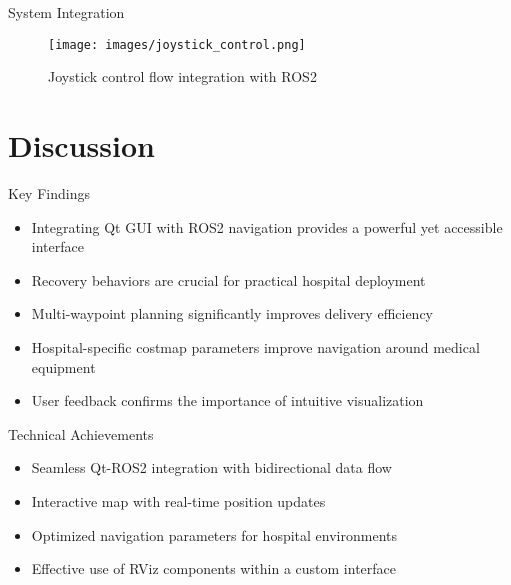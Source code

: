 \documentclass[aspectratio=169]{beamer}
\begin{document}
\begin{frame}{System Integration}
  \begin{figure}
    \centering
    \texttt{[image: images/joystick\_control.png]}
    \caption{Joystick control flow integration with ROS2}
  \end{figure}
\end{frame}

\section{Discussion}

\begin{frame}{Key Findings}
  \begin{itemize}
  \item Integrating Qt GUI with ROS2 navigation provides a powerful yet accessible interface
  \item Recovery behaviors are crucial for practical hospital deployment
  \item Multi-waypoint planning significantly improves delivery efficiency
  \item Hospital-specific costmap parameters improve navigation around medical equipment
  \item User feedback confirms the importance of intuitive visualization
  \end{itemize}
  
  \begin{block}{Technical Achievements}
    \begin{itemize}
    \item Seamless Qt-ROS2 integration with bidirectional data flow
    \item Interactive map with real-time position updates
    \item Optimized navigation parameters for hospital environments
    \item Effective use of RViz components within a custom interface
    \end{itemize}
  \end{block}
\end{frame}
\end{document}
